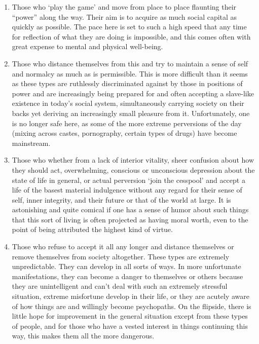 \begin{enumerate}
\item Those who `play the game' and move from place to place flaunting their ``power'' along the way. Their aim is to acquire as much social capital as quickly as possible. The pace here is set to such a high speed that any time for reflection of what they are doing is impossible, and this comes often with great expense to mental and physical well-being.

\item Those who distance themselves from this and try to maintain a sense of self and normalcy as much as is permissible. This is more difficult than it seems as these types are ruthlessly discriminated against by those in positions of power and are increasingly being prepared for and often accepting a slave-like existence in today's social system, simultaneously carrying society on their backs yet deriving an increasingly small pleasure from it. Unfortunately, one is no longer safe here, as some of the more extreme perversions of the day (mixing across castes, pornography, certain types of drugs) have become mainstream.

\item Those who whether from a lack of interior vitality, sheer confusion about how they should act, overwhelming, conscious or unconscious depression about the state of life in general, or actual perversion `join the cesspool' and accept a life of the basest material indulgence without any regard for their sense of self, inner integrity, and their future or that of the world at large. It is astonishing and quite comical if one has a sense of humor about such things that this sort of living is often projected as having moral worth, even to the point of being attributed the highest kind of virtue.

\item Those who refuse to accept it all any longer and distance themselves or remove themselves from society altogether. These types are extremely unpredictable. They can develop in all sorts of ways. In more unfortunate manifestations, they can become a danger to themselves or others because they are unintelligent and can't deal with such an extremely stressful situation, extreme misfortune develop in their life, or they are acutely aware of how things are and willingly become psychopaths. On the flipside, there is little hope for improvement in the general situation except from these types of people, and for those who have a vested interest in things continuing this way, this makes them all the more dangerous.
\end{enumerate}

